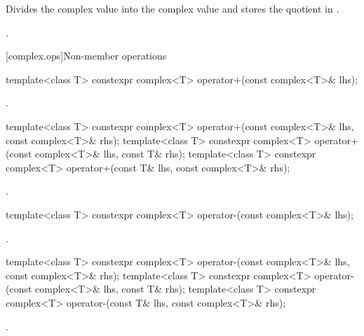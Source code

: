 \begin{itemdescr}
\pnum
\effects
Divides the complex value  into the complex value
and stores the quotient in
.

\pnum
\returns
{}.
\end{itemdescr}

[complex.ops]{Non-member operations}

%
\begin{itemdecl}
template<class T> constexpr complex<T> operator+(const complex<T>& lhs);
\end{itemdecl}

\begin{itemdescr}
\pnum
\returns
{}.
\end{itemdescr}

\begin{itemdecl}
template<class T> constexpr complex<T> operator+(const complex<T>& lhs, const complex<T>& rhs);
template<class T> constexpr complex<T> operator+(const complex<T>& lhs, const T& rhs);
template<class T> constexpr complex<T> operator+(const T& lhs, const complex<T>& rhs);
\end{itemdecl}

\begin{itemdescr}
\pnum
\returns
{}.
\end{itemdescr}

%
\begin{itemdecl}
template<class T> constexpr complex<T> operator-(const complex<T>& lhs);
\end{itemdecl}

\begin{itemdescr}
\pnum
\returns
{}.
\end{itemdescr}

%
\begin{itemdecl}
template<class T> constexpr complex<T> operator-(const complex<T>& lhs, const complex<T>& rhs);
template<class T> constexpr complex<T> operator-(const complex<T>& lhs, const T& rhs);
template<class T> constexpr complex<T> operator-(const T& lhs, const complex<T>& rhs);
\end{itemdecl}

\begin{itemdescr}
\pnum
\returns
{}.
\end{itemdescr}

